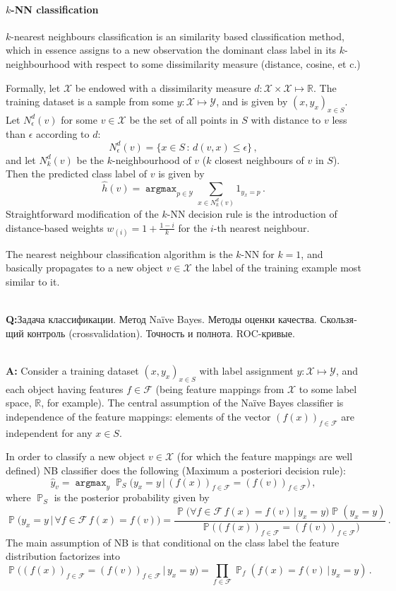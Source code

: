\documentclass[a4paper]{article}
\newcommand{\Fcal}{\mathcal{F}}
\newcommand{\Xcal}{\mathcal{X}}
\newcommand{\Ycal}{\mathcal{Y}}
\newcommand{\Real}{\mathbb{R}}
\newcommand{\argmax}{\mathop{\mathtt{argmax}}\nolimits}
\newcommand{\pr}{\mathop{\mathbb{P}}\nolimits}
\newcommand{\rus}[1]{\foreignlanguage{russian}{#1}}
\begin{document}

\paragraph{$k$-NN classification} %
\label{par:kNN_clssification}

$k$-nearest neighbours classification is an similarity based classification method,
which in essence assigns to a new observation the dominant class label in its $k$-
neighbourhood with respect to some dissimilarity measure (distance, cosine, et c.)

Formally, let $\Xcal$ be endowed with a dissimilarity measure $d:\Xcal\times \Xcal
\mapsto \Real$. The training dataset is a sample from some $y:\Xcal\mapsto \Ycal$,
and is given by $(x, y_x)_{x\in S}$. Let $N_\epsilon^d(v)$ for some $v\in \Xcal$
be the set of all points in $S$ with distance to $v$ less than $\epsilon$ according
to $d$:
$$ N_\epsilon^d(v) = \{x\in S\,:\, d(v, x) \leq \epsilon \} \,, $$
and let $N_k^d(v)$ be the $k$-neighbourhood of $v$ ($k$ closest neighbours of $v$
in $S$). Then the predicted class label of $v$ is given by
$$ \hat{h}(v) = \argmax_{p\in \Ycal} \sum_{x\in N_k^d(v)} 1_{y_x = p}\,. $$
Straightforward modification of the $k$-NN decision rule is the introduction of
distance-based weights $w_{(i)} = 1 + \frac{1-i}{k}$ for the $i$-th nearest neighbour.

The nearest neighbour classification algorithm is the $k$-NN for $k=1$, and basically
propagates to a new object $v\in \Xcal$ the label of the training example most similar
to it.


\hfill\\\textbf{Q:}\rus{Задача классификации.  Метод Naïve Bayes. Методы оценки
качества. Скользящий контроль (crossvalidation). Точность и полнота. ROC-кривые.}

\hfill\\\textbf{A:}
Consider a training dataset $(x, y_x)_{x\in S}$ with label assignment $y:\Xcal\mapsto
\Ycal$, and each object having features $f\in \Fcal$ (being feature mappings from
$\Xcal$ to some label space, $\Real$, for example). The central assumption of the
Na\"ive Bayes classifier is independence of the feature mappings: elements of the
vector $(f(x))_{f\in \Fcal}$ are independent for any $x\in S$.

In order to classify a new object $v\in \Xcal$ (for which the feature mappings are
well defined) NB classifier does the following (Maximum a posteriori decision rule):
$$ \hat{y}_v
    = \argmax_y \pr_S\bigl(y_x = y \,|\,
            (f(x))_{f\in \Fcal} = (f(v))_{f\in \Fcal}\bigr)
    \,, $$
where $\pr_S$ is the posterior probability given by
$$ \pr\bigl(y_x = y \,|\, \forall f\in \Fcal\, f(x) = f(v)\bigr)
    = \frac{\pr\bigl(\forall f\in \Fcal\, f(x) = f(v) \,|\, y_x = y\bigr)
            \pr(y_x = y)}
        {\pr\bigl((f(x))_{f\in \Fcal} = (f(v))_{f\in \Fcal}\bigr)}
    \,. $$
The main assumption of NB is that conditional on the class label the feature distribution
factorizes into
$$ \pr\bigl((f(x))_{f\in \Fcal} = (f(v))_{f\in \Fcal} \,|\, y_x = y\bigr)
    = \prod_{f\in \Fcal} \pr_f(f(x) = f(v) \,|\, y_x = y)
    \,. $$ 
\end{document}
